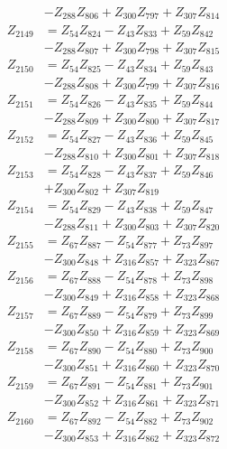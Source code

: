 \begin{multicols}{2}
\begin{align}
&- Z_{288}Z_{806} + Z_{300}Z_{797} + Z_{307}Z_{814} \nonumber \\
Z_{2149} &= Z_{54}Z_{824} - Z_{43}Z_{833} + Z_{59}Z_{842}  \nonumber \\
&- Z_{288}Z_{807} + Z_{300}Z_{798} + Z_{307}Z_{815} \nonumber \\
Z_{2150} &= Z_{54}Z_{825} - Z_{43}Z_{834} + Z_{59}Z_{843}  \nonumber \\
&- Z_{288}Z_{808} + Z_{300}Z_{799} + Z_{307}Z_{816} \nonumber \\
Z_{2151} &= Z_{54}Z_{826} - Z_{43}Z_{835} + Z_{59}Z_{844}  \nonumber \\
&- Z_{288}Z_{809} + Z_{300}Z_{800} + Z_{307}Z_{817} \nonumber \\
Z_{2152} &= Z_{54}Z_{827} - Z_{43}Z_{836} + Z_{59}Z_{845}  \nonumber \\
&- Z_{288}Z_{810} + Z_{300}Z_{801} + Z_{307}Z_{818} \nonumber \\
Z_{2153} &= Z_{54}Z_{828} - Z_{43}Z_{837} + Z_{59}Z_{846}  \nonumber \\
&+ Z_{300}Z_{802} + Z_{307}Z_{819} \nonumber \\
Z_{2154} &= Z_{54}Z_{829} - Z_{43}Z_{838} + Z_{59}Z_{847}  \nonumber \\
&- Z_{288}Z_{811} + Z_{300}Z_{803} + Z_{307}Z_{820} \nonumber \\
Z_{2155} &= Z_{67}Z_{887} - Z_{54}Z_{877} + Z_{73}Z_{897}  \nonumber \\
&- Z_{300}Z_{848} + Z_{316}Z_{857} + Z_{323}Z_{867} \nonumber \\
Z_{2156} &= Z_{67}Z_{888} - Z_{54}Z_{878} + Z_{73}Z_{898}  \nonumber \\
&- Z_{300}Z_{849} + Z_{316}Z_{858} + Z_{323}Z_{868} \nonumber \\
Z_{2157} &= Z_{67}Z_{889} - Z_{54}Z_{879} + Z_{73}Z_{899}  \nonumber \\
&- Z_{300}Z_{850} + Z_{316}Z_{859} + Z_{323}Z_{869} \nonumber \\
Z_{2158} &= Z_{67}Z_{890} - Z_{54}Z_{880} + Z_{73}Z_{900}  \nonumber \\
&- Z_{300}Z_{851} + Z_{316}Z_{860} + Z_{323}Z_{870} \nonumber \\
Z_{2159} &= Z_{67}Z_{891} - Z_{54}Z_{881} + Z_{73}Z_{901}  \nonumber \\
&- Z_{300}Z_{852} + Z_{316}Z_{861} + Z_{323}Z_{871} \nonumber \\
Z_{2160} &= Z_{67}Z_{892} - Z_{54}Z_{882} + Z_{73}Z_{902}  \nonumber \\
&- Z_{300}Z_{853} + Z_{316}Z_{862} + Z_{323}Z_{872} \nonumber \\

\end{align}
\end{multicols}
